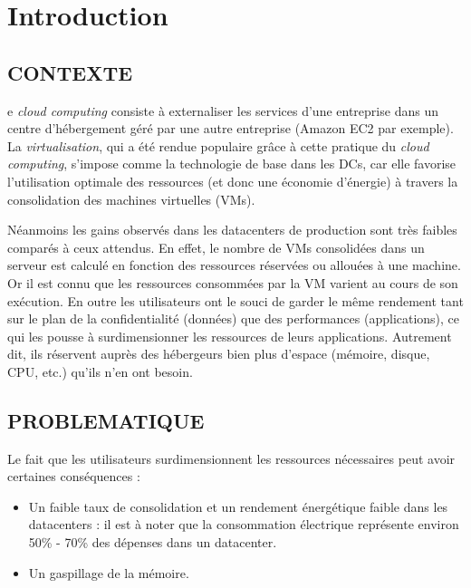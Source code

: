 %
%
\chapter*{Introduction}
\label{chap:intro}
\adjustmtc
\section*{CONTEXTE}

e \emph{cloud computing} consiste à externaliser les services d’une entreprise dans un centre d’hébergement géré par une autre entreprise (Amazon EC2 par exemple). La \emph{virtualisation}, qui a été rendue populaire grâce à cette pratique du \emph{cloud computing}, s'impose comme la technologie de base dans les \ac{DCs}, car elle favorise l'utilisation optimale des ressources (et donc une économie d'énergie) à travers la \break consolidation des machines virtuelles (VMs).
\par\noindent Néanmoins les gains observés dans les datacenters de production sont très faibles comparés à ceux attendus. En effet, le nombre de VMs consolidées dans un serveur est calculé en fonction des ressources réservées ou allouées à une machine. Or il est connu que les ressources consommées par la VM varient au cours de son exécution. En outre les utilisateurs ont le souci de garder le même rendement tant sur le plan de la confidentialité (données) que des performances (applications), ce qui les pousse à surdimensionner les ressources de leurs applications. Autrement dit, ils réservent auprès des hébergeurs bien plus d'espace (mémoire, disque, CPU, etc.) qu'ils n'en ont besoin.

\section*{PROBLEMATIQUE}

Le fait que les utilisateurs surdimensionnent les ressources nécessaires peut avoir certaines conséquences :

\begin{itemize}[label=, font=\large \color{darkorange}]
    \item Un faible taux de consolidation et un rendement énergétique faible dans les datacenters :  il est à noter que la consommation électrique représente environ 50\% - 70\% des dépenses dans un datacenter.
    \item Un gaspillage de la mémoire.
\end{itemize}

